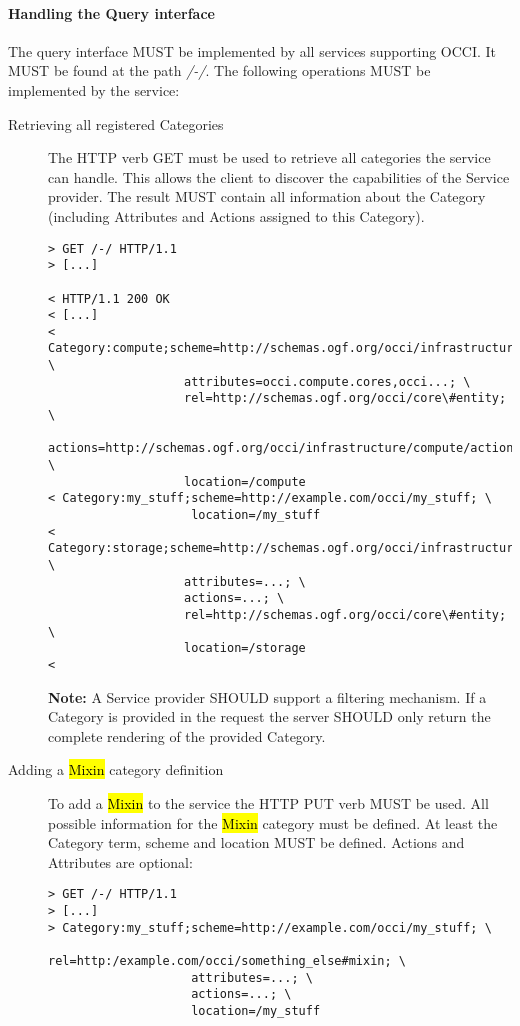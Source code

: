 \documentclass[10pt,a4paper]{article}
\begin{document}
\paragraph{Handling the Query interface}
The query interface MUST be implemented by all services supporting
OCCI. It MUST be found at the path \emph{/-/}. The following
operations MUST be implemented by the service:

\begin{description}
\item[Retrieving all registered Categories] The HTTP verb GET must be
  used to retrieve all categories the service can handle. This allows
  the client to discover the capabilities of the Service provider. The
  result MUST contain all information about the Category (including
  Attributes and Actions assigned to this Category).
\begin{verbatim}
> GET /-/ HTTP/1.1
> [...]
 
< HTTP/1.1 200 OK
< [...]
< Category:compute;scheme=http://schemas.ogf.org/occi/infrastructure; \
                   attributes=occi.compute.cores,occi...; \
                   rel=http://schemas.ogf.org/occi/core\#entity; \
                   actions=http://schemas.ogf.org/occi/infrastructure/compute/action#stop,...; \
                   location=/compute
< Category:my_stuff;scheme=http://example.com/occi/my_stuff; \
                    location=/my_stuff
< Category:storage;scheme=http://schemas.ogf.org/occi/infrastructure; \
                   attributes=...; \
                   actions=...; \
                   rel=http://schemas.ogf.org/occi/core\#entity; \
                   location=/storage
< 
\end{verbatim}
\textbf{Note:} A Service provider SHOULD support a filtering
mechanism. If a Category is provided in the request the server SHOULD
only return the complete rendering of the provided Category.

\item[Adding a \hl{Mixin} category definition] To add a \hl{Mixin} to
  the service the HTTP PUT verb MUST be used. All possible information
  for the \hl{Mixin} category must be defined. At least the Category
  term, scheme and location MUST be defined. Actions and Attributes
  are optional:
\begin{verbatim}
> GET /-/ HTTP/1.1
> [...]
> Category:my_stuff;scheme=http://example.com/occi/my_stuff; \
                    rel=http:/example.com/occi/something_else#mixin; \
                    attributes=...; \
                    actions=...; \
                    location=/my_stuff


\end{verbatim}
\end{description}
\end{document}
